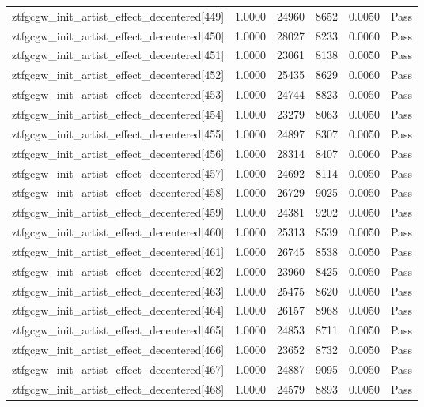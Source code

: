 \begin{table}[htbp]
\begin{tabular}{llrrll}
ztfgcgw\_init\_artist\_effect\_decentered[449] & 1.0000 & 24960 & 8652 & 0.0050 & Pass \\
ztfgcgw\_init\_artist\_effect\_decentered[450] & 1.0000 & 28027 & 8233 & 0.0060 & Pass \\
ztfgcgw\_init\_artist\_effect\_decentered[451] & 1.0000 & 23061 & 8138 & 0.0050 & Pass \\
ztfgcgw\_init\_artist\_effect\_decentered[452] & 1.0000 & 25435 & 8629 & 0.0060 & Pass \\
ztfgcgw\_init\_artist\_effect\_decentered[453] & 1.0000 & 24744 & 8823 & 0.0050 & Pass \\
ztfgcgw\_init\_artist\_effect\_decentered[454] & 1.0000 & 23279 & 8063 & 0.0050 & Pass \\
ztfgcgw\_init\_artist\_effect\_decentered[455] & 1.0000 & 24897 & 8307 & 0.0050 & Pass \\
ztfgcgw\_init\_artist\_effect\_decentered[456] & 1.0000 & 28314 & 8407 & 0.0060 & Pass \\
ztfgcgw\_init\_artist\_effect\_decentered[457] & 1.0000 & 24692 & 8114 & 0.0050 & Pass \\
ztfgcgw\_init\_artist\_effect\_decentered[458] & 1.0000 & 26729 & 9025 & 0.0050 & Pass \\
ztfgcgw\_init\_artist\_effect\_decentered[459] & 1.0000 & 24381 & 9202 & 0.0050 & Pass \\
ztfgcgw\_init\_artist\_effect\_decentered[460] & 1.0000 & 25313 & 8539 & 0.0050 & Pass \\
ztfgcgw\_init\_artist\_effect\_decentered[461] & 1.0000 & 26745 & 8538 & 0.0050 & Pass \\
ztfgcgw\_init\_artist\_effect\_decentered[462] & 1.0000 & 23960 & 8425 & 0.0050 & Pass \\
ztfgcgw\_init\_artist\_effect\_decentered[463] & 1.0000 & 25475 & 8620 & 0.0050 & Pass \\
ztfgcgw\_init\_artist\_effect\_decentered[464] & 1.0000 & 26157 & 8968 & 0.0050 & Pass \\
ztfgcgw\_init\_artist\_effect\_decentered[465] & 1.0000 & 24853 & 8711 & 0.0050 & Pass \\
ztfgcgw\_init\_artist\_effect\_decentered[466] & 1.0000 & 23652 & 8732 & 0.0050 & Pass \\
ztfgcgw\_init\_artist\_effect\_decentered[467] & 1.0000 & 24887 & 9095 & 0.0050 & Pass \\
ztfgcgw\_init\_artist\_effect\_decentered[468] & 1.0000 & 24579 & 8893 & 0.0050 & Pass \\

\end{tabular}
\end{table}
